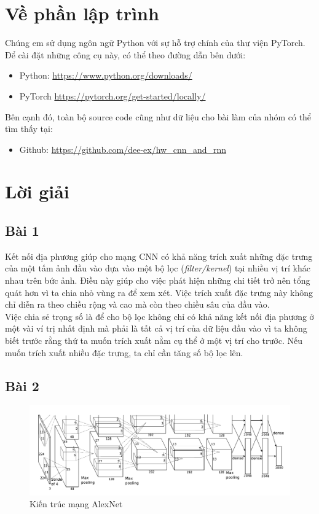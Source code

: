 \documentclass[a4paper]{article}
\begin{document}
\section{Về phần lập trình}
Chúng em sử dụng ngôn ngữ Python với sự hỗ trợ chính của thư viện PyTorch. Để cài đặt những công cụ này, có thể theo đường dẫn bên dưới:
\begin{itemize}
    \item Python: \href{https://www.python.org/downloads/}{https://www.python.org/downloads/}
    \item PyTorch \href{https://pytorch.org/get-started/locally/}{https://pytorch.org/get-started/locally/}
\end{itemize}
Bên cạnh đó, toàn bộ source code cũng như dữ liệu cho bài làm của nhóm có thể tìm thấy tại:
\begin{itemize}
    \item Github: \href{https://github.com/dee-ex/hw\_cnn\_and\_rnn}{https://github.com/dee-ex/hw\_cnn\_and\_rnn}
\end{itemize}
\newpage

\section{Lời giải}

\subsection{Bài 1}
Kết nối địa phương giúp cho mạng CNN có khả năng trích xuất những đặc trưng của một tấm ảnh đầu vào dựa vào một bộ lọc (\textit{filter/kernel}) tại nhiều vị trí khác nhau trên bức ảnh. Điều này giúp cho việc phát hiện những chi tiết trở nên tổng quát hơn vì ta chia nhỏ vùng ra để xem xét. Việc trích xuất đặc trưng này không chỉ diễn ra theo chiều rộng và cao mà còn theo chiều sâu của đầu vào.\\
Việc chia sẻ trọng số là để cho bộ lọc không chỉ có khả năng kết nối địa phương ở một vài ví trị nhất định mà phải là tất cả vị trí của dữ liệu đầu vào vì ta không biết trước rằng thứ ta muốn trích xuất nằm cụ thể ở một vị trí cho trước. Nếu muốn trích xuất nhiều đặc trưng, ta chỉ cần tăng số bộ lọc lên.

\subsection{Bài 2}
\begin{figure}[h!]
\centering
\includegraphics[width=17cm]{images/alexnet.png}
\caption{Kiến trúc mạng AlexNet}
\end{figure}
\end{document}
